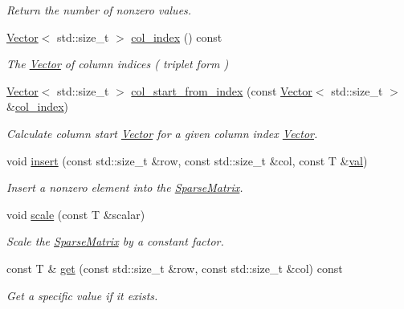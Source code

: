 \begin{DoxyCompactItemize}
\begin{DoxyCompactList}\small\item\em Return the number of nonzero values. \end{DoxyCompactList}\item 
\hyperlink{classLuna_1_1Vector}{Vector}$<$ std\+::size\+\_\+t $>$ \hyperlink{classLuna_1_1SparseMatrix_ae7f456c12b3075f21b15bb4ee114d8af}{col\+\_\+index} () const
\begin{DoxyCompactList}\small\item\em The \hyperlink{classLuna_1_1Vector}{Vector} of column indices ( triplet form ) \end{DoxyCompactList}\item 
\hyperlink{classLuna_1_1Vector}{Vector}$<$ std\+::size\+\_\+t $>$ \hyperlink{classLuna_1_1SparseMatrix_aff245e8e7b0609dd7dc5c2a533c43c87}{col\+\_\+start\+\_\+from\+\_\+index} (const \hyperlink{classLuna_1_1Vector}{Vector}$<$ std\+::size\+\_\+t $>$ \&\hyperlink{classLuna_1_1SparseMatrix_ae7f456c12b3075f21b15bb4ee114d8af}{col\+\_\+index})
\begin{DoxyCompactList}\small\item\em Calculate column start \hyperlink{classLuna_1_1Vector}{Vector} for a given column index \hyperlink{classLuna_1_1Vector}{Vector}. \end{DoxyCompactList}\item 
void \hyperlink{classLuna_1_1SparseMatrix_a88b48b128919c77faa81616a2e5942af}{insert} (const std\+::size\+\_\+t \&row, const std\+::size\+\_\+t \&col, const T \&\hyperlink{classLuna_1_1SparseMatrix_ac22d87e2fb618c6140c579bc72dd503b}{val})
\begin{DoxyCompactList}\small\item\em Insert a nonzero element into the \hyperlink{classLuna_1_1SparseMatrix}{Sparse\+Matrix}. \end{DoxyCompactList}\item 
void \hyperlink{classLuna_1_1SparseMatrix_aacf1e09ba5c58c5d925323ae2a8996d0}{scale} (const T \&scalar)
\begin{DoxyCompactList}\small\item\em Scale the \hyperlink{classLuna_1_1SparseMatrix}{Sparse\+Matrix} by a constant factor. \end{DoxyCompactList}\item 
const T \& \hyperlink{classLuna_1_1SparseMatrix_a2d19f0b3329cfde15c6c852ecb6e27c7}{get} (const std\+::size\+\_\+t \&row, const std\+::size\+\_\+t \&col) const
\begin{DoxyCompactList}\small\item\em Get a specific value if it exists. \end{DoxyCompactList}\item 

\end{DoxyCompactItemize}
